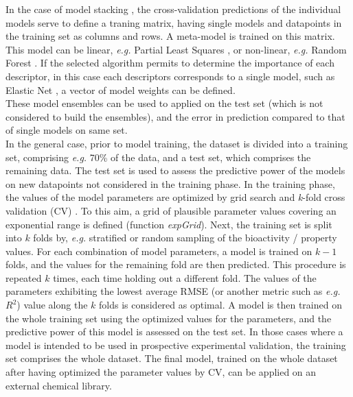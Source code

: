 \documentclass[twoside,a4wide,10pt]{article}
\begin{document}
In the case of model stacking \citep{cortesCOX}, 
the cross-validation predictions of the individual models serve to define a traning matrix,
having single models and datapoints in the training set as columns and rows.
A meta-model is trained on this matrix.
This model can be linear, {\it e.g.} Partial Least Squares \citep{pls},
or non-linear, {\it e.g.} Random Forest \citep{rf}.
If the selected algorithm permits to determine the importance of each descriptor, in this case each descriptors corresponds to a single model,
such as Elastic Net \citep{enet}, a vector of model weights can be defined.\\

These model ensembles can be used to applied on the test set (which is not considered to build the ensembles), and the error in prediction compared to that of single models on same set.\\

In the general case, prior to model training, the dataset is divided into a training set,
comprising {\it e.g.} 70\% of the data, and 
a test set, which comprises the remaining data.
The test set is used to assess the predictive power of the models on new datapoints
not considered in the training phase.
In the training phase, the values of the model parameters are optimized by grid search and {\it k}-fold cross validation (CV) \citep{overfitting}.
To this aim, a grid of plausible parameter values covering an exponential range is defined (function {\it expGrid}).
Next, the training set is split into $k$ folds by, {\it e.g.} stratified or random sampling of the bioactivity / property values.
For each combination of model parameters, 
a model is trained on $k-1$ folds, and the values for the remaining fold are then predicted. 
This procedure is repeated $k$ times, each time holding out a different fold. 
The values of the parameters exhibiting the lowest average RMSE (or another metric such as {\it e.g.} $R^2$)
value along the $k$ folds is considered as optimal. 
A model is then trained on the whole training set using the optimized values for the parameters,
and the predictive power of this model is assessed on the test set. 
In those cases where a model is intended to be used in prospective experimental validation,
the training set comprises the whole dataset.
The final model, trained on the whole dataset after having optimized the parameter values by CV,
can be applied on an external chemical library.
\end{document}
